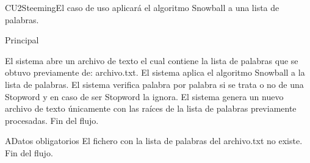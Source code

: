 
% 



	

	\begin{UseCase}{CU2}{Steeming}{El caso de uso aplicar\'a el algoritmo Snowball a una lista de palabras.
	}
	\end{UseCase}

	\begin{UCtrayectoria}{Principal}
	
		\UCpaso  El sistema abre un archivo de texto el cual contiene la lista de palabras que se obtuvo previamente de: archivo.txt. 
                \UCpaso El sistema aplica el algoritmo Snowball a la lista de palabras.
		\UCpaso El sistema verifica palabra por palabra si se trata o no de una Stopword y en caso de ser Stopword la ignora.
		\UCpaso  El sistema genera un nuevo archivo de texto \'unicamente con las ra\'ices de la lista de palabras previamente procesadas.
				    \UCpaso[] Fin del flujo.
	\end{UCtrayectoria}
	
			\begin{UCtrayectoriaA}{A}{Datos obligatorios}
		    \UCpaso El fichero con la lista de palabras del archivo.txt no existe.
		    \UCpaso[] Fin del flujo.
    		\end{UCtrayectoriaA}

		
